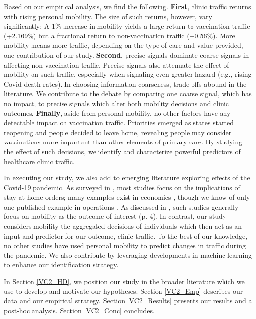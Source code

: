  Based on our empirical analysis, we find the following. \textbf{First}, clinic traffic returns with rising personal mobility. The size of such returns, however, vary significantly: A 1\% increase in mobility yields a large return to vaccination traffic (+2.169\%) but a fractional return to non-vaccination traffic (+0.56\%). More mobility means more traffic, depending on the type of care and value provided, one contribution of our study. \textbf{Second}, precise signals dominate coarse signals in affecting non-vaccination traffic. Precise signals also attenuate the effect of mobility on such traffic, especially when signaling even greater hazard (e.g., rising Covid death rates). In choosing information coarseness, trade-offs abound in the literature. We contribute to the debate by comparing one coarse signal, which has no impact, to precise signals which alter both mobility decisions and clinic outcomes. \textbf{Finally}, aside from personal mobility, no other factors have any detectable impact on vaccination traffic. Priorities emerged as states started reopening and people decided to leave home, revealing people may consider vaccinations more important than other elements of primary care. By studying the effect of such decisions, we identify and characterize powerful predictors of healthcare clinic traffic.

 In executing our study, we also add to emerging literature exploring effects of the Covid-19 pandemic. As surveyed in \cite{Gupta2020a}, most studies focus on the implications of stay-at-home orders; many examples exist in economics \citep[e.g.,][]{Goolsbee2020_key,Goolsbee2020_unpub,Alfaro2020,Cantor2020,Alfaro2021,Ziedan2020,Farboodi2020,Zhang2020}, though we know of only one published example in operations \citep{Wang2021}. As discussed in \cite{Wang2021}, such studies generally focus on mobility as the outcome of interest (p. 4). In contrast, our study considers mobility the aggregated decisions of individuals which then act as an input and predictor for our outcome, clinic traffic. To the best of our knowledge, no other studies have used personal mobility to predict changes in traffic during the pandemic. We also contribute by leveraging developments in machine learning to enhance our identification strategy.
 
 In Section \ref{VC2_HD}, we position our study in the broader literature which we use to develop and motivate our hypotheses. Section \ref{VC2_Emp} describes our data and our empirical strategy. Section \ref{VC2_Results} presents our results and a post-hoc analysis. Section \ref{VC2_Conc} concludes.
  

